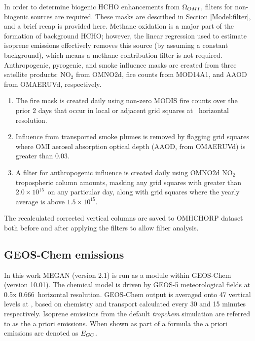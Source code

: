     In order to determine biogenic HCHO enhancements from $\Omega_{OMI}$, filters for non-biogenic sources are required.
    These masks are described in Section \ref{Model:filter}, and a brief recap is provided here.
    Methane oxidation is a major part of the formation of background HCHO; however, the linear regression used to estimate isoprene emissions effectively removes this source (by assuming a constant background), which means a methane contribution filter is not required.
    Anthropogenic, pyrogenic, and smoke influence masks are created from three satellite products: NO$_2$ from OMNO2d, fire counts from MOD14A1, and AAOD from OMAERUVd, respectively.
    \begin{enumerate}
      \item 
      The fire mask is created daily using non-zero MODIS fire counts over the prior 2 days that occur in local or adjacent grid squares at \highhr ~horizontal resolution.
      \item 
      Influence from transported smoke plumes is removed by flagging grid squares where OMI aerosol absorption optical depth (AAOD, from OMAERUVd) is greater than 0.03.
      \item 
      A filter for anthropogenic influence is created daily using OMNO2d NO$_2$ tropospheric column amounts, masking any grid squares with greater than $2.0 \times 10^{15}$\moleccm ~on any particular day, along with grid squares where the yearly average is above $1.5 \times 10^{15}$\moleccm.
    \end{enumerate}
    The recalculated corrected vertical columns are saved to OMHCHORP dataset both before and after applying the filters to allow filter analysis.
    
    
  \subsection{GEOS-Chem emissions}
    
    In this work MEGAN (version 2.1) is run as a module within GEOS-Chem (version 10.01).
    The chemical model is driven by GEOS-5 meteorological fields at 0.5\degr x 0.666\degr ~horizontal resolution.
    GEOS-Chem output is averaged onto 47 vertical levels at \lowhr, based on chemistry and transport calculated every 30 and 15 minutes respectively.
    Isoprene emissions from the default \textit{tropchem} simulation are referred to as the a priori emissions.
    When shown as part of a formula the a priori emissions are denoted as $E_{GC}$.
    
